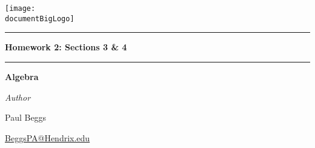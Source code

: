 \documentclass[12pt, oneside]{book}
\newcommand{\documentBigLogo}{../images/logo_white_text.png}
\newcounter{BoxCounter}
\begin{document}



\newcommand{\assignmentname}{Homework 2: Sections 3 \& 4}

\newcommand{\cussubtitle}{Algebra}
\newcommand{\finaldate}{Septemeber 11, 2025}
\newcommand{\professor}{Dr. Christopher Camfield, Ph.D.}




\begin{titlepage}
    \begin{center}

        \vspace*{-2cm}
        \texttt{[image: \\documentBigLogo]}\\
        \vfill

        \textcolor{horange}{\rule{\textwidth}{1.0pt}}

        \vspace{2em}

        {\huge \textbf{\assignmentname}}

        \vspace{1em} %

        \textcolor{horange}{\rule{\textwidth}{1.0pt}}

        \vspace*{1\baselineskip}

        {\LARGE \textbf{\cussubtitle}}

        \begin{large}
            \vspace*{5\baselineskip}

            \vspace*{1\baselineskip}

            \emph{Author} \\[1ex]
            {\Large Paul Beggs \\ \par} %
            {\href{mailto:BeggsPA@Hendrix.edu}{{BeggsPA@Hendrix.edu}}}\\ %


\end{large}
\end{center}
\end{titlepage}
\end{document}
